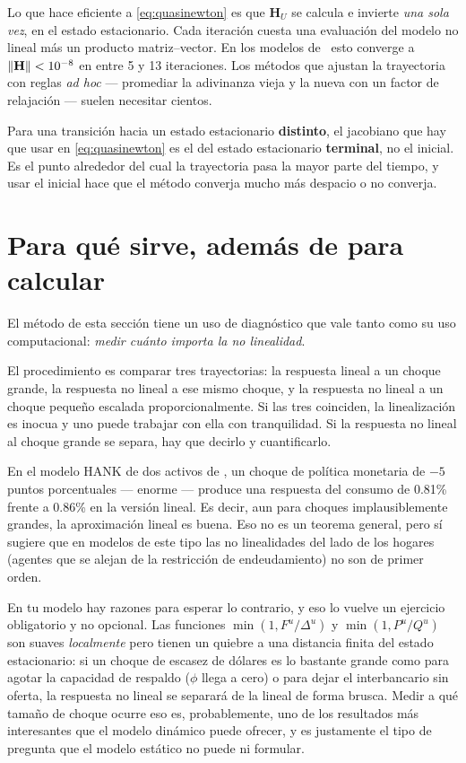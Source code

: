 Lo que hace eficiente a \eqref{eq:quasinewton} es que $\mathbf{H}_U$ se calcula e
invierte \emph{una sola vez}, en el estado estacionario. Cada iteración cuesta
una evaluación del modelo no lineal más un producto matriz--vector. En los
modelos de \abrs\ esto converge a $\left\lVert \mathbf{H} \right\rVert<10^{-8}$ en entre 5 y 13
iteraciones. Los métodos que ajustan la trayectoria con reglas \emph{ad hoc}
--- promediar la adivinanza vieja y la nueva con un factor de relajación ---
suelen necesitar cientos.

\begin{trampa}
Para una transición hacia un estado estacionario \textbf{distinto}, el jacobiano
que hay que usar en \eqref{eq:quasinewton} es el del estado estacionario
\textbf{terminal}, no el inicial. Es el punto alrededor del cual la trayectoria
pasa la mayor parte del tiempo, y usar el inicial hace que el método converja
mucho más despacio o no converja.
\end{trampa}

\section{Para qué sirve, además de para calcular}

El método de esta sección tiene un uso de diagnóstico que vale tanto como su uso
computacional: \emph{medir cuánto importa la no linealidad}.

El procedimiento es comparar tres trayectorias: la respuesta lineal a un choque
grande, la respuesta no lineal a ese mismo choque, y la respuesta no lineal a un
choque pequeño escalada proporcionalmente. Si las tres coinciden, la
linealización es inocua y uno puede trabajar con ella con tranquilidad. Si la
respuesta no lineal al choque grande se separa, hay que decirlo y cuantificarlo.

En el modelo HANK de dos activos de \abrs, un choque de política monetaria de
$-5$ puntos porcentuales --- enorme --- produce una respuesta del consumo de
0.81\% frente a 0.86\% en la versión lineal. Es decir, aun para choques
implausiblemente grandes, la aproximación lineal es buena. Eso no es un teorema
general, pero sí sugiere que en modelos de este tipo las no linealidades del
lado de los hogares (agentes que se alejan de la restricción de endeudamiento)
no son de primer orden.

\begin{tutesis}
En tu modelo hay razones para esperar lo contrario, y eso lo vuelve un ejercicio
obligatorio y no opcional. Las funciones $\min(1, F^u/\Delta^u)$ y
$\min(1, P^u/Q^u)$ son suaves \emph{localmente} pero tienen un quiebre a una
distancia finita del estado estacionario: si un choque de escasez de dólares es
lo bastante grande como para agotar la capacidad de respaldo ($\phi$ llega a
cero) o para dejar el interbancario sin oferta, la respuesta no lineal se
separará de la lineal de forma brusca. Medir a qué tamaño de choque ocurre eso
es, probablemente, uno de los resultados más interesantes que el modelo dinámico
puede ofrecer, y es justamente el tipo de pregunta que el modelo estático no
puede ni formular.
\end{tutesis}

